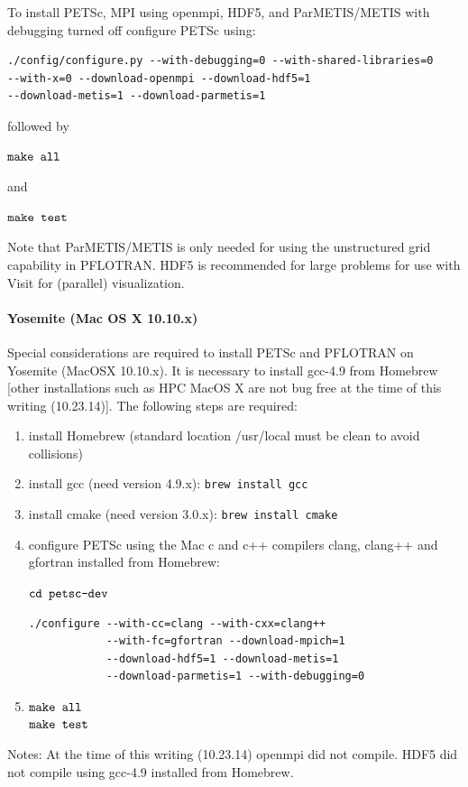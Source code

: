 To install PETSc, MPI using openmpi, HDF5, and ParMETIS/METIS with debugging turned off configure PETSc using:

\begin{verbatim}
./config/configure.py --with-debugging=0 --with-shared-libraries=0 
--with-x=0 --download-openmpi --download-hdf5=1 
--download-metis=1 --download-parmetis=1
\end{verbatim}

\noindent
followed by

$\verb|make all|$

\noindent
and

$\verb|make test|$

Note that ParMETIS/METIS is only needed for using the unstructured grid capability in PFLOTRAN. HDF5 is recommended for large problems for use with Visit for (parallel) visualization.

\paragraph{Yosemite (Mac OS X 10.10.x)} Special considerations are required to install PETSc and PFLOTRAN on Yosemite (MacOSX 10.10.x). It is necessary to install gcc-4.9 from Homebrew [other installations such as HPC MacOS X are not bug free at the time of this writing (10.23.14)]. The following steps are required:
\begin{enumerate}
\item install Homebrew (standard location /usr/local must be clean to avoid collisions)
\item install gcc (need version 4.9.x): \texttt{brew install gcc}
\item install cmake (need version 3.0.x): \texttt{brew install cmake}
\item configure PETSc using the Mac c and c++ compilers clang, clang++ and gfortran installed from Homebrew: 

$\verb|cd petsc-dev|$\\
\begin{verbatim}
./configure --with-cc=clang --with-cxx=clang++ 
            --with-fc=gfortran --download-mpich=1 
            --download-hdf5=1 --download-metis=1 
            --download-parmetis=1 --with-debugging=0
\end{verbatim} 

\item $\verb|make all|$\\ $\verb|make test|$
\end{enumerate}
Notes: At the time of this writing (10.23.14) openmpi did not compile. HDF5 did not compile using gcc-4.9 installed from Homebrew.

